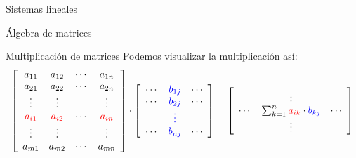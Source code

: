 \begin{chapter}{Sistemas lineales}
\begin{section}{\'Algebra de matrices}
\begin{subsection}{Multiplicaci\'on de matrices}
                Podemos visualizar la multiplicación así:
                \begin{align*}
                    \left[
                    \begin{array}{cccc}
                        a_{11} & a_{12} & \cdots & a_{1n}\\ 
                        a_{21} & a_{22} & \cdots & a_{2n}\\
                        \vdots & \vdots & & \vdots\\
                        \textcolor{red}{a_{i1}} & \textcolor{red}{a_{i2}} & \cdots & \textcolor{red}{a_{in}}\\  
                        \vdots & \vdots & & \vdots\\
                        a_{m1} & a_{m2} & \cdots & a_{mn}
                    \end{array}
                    \right] 
                    \cdot
                    \left[
                    \begin{array}{ccc}
                        \cdots & \textcolor{blue}{b_{1j}} & \cdots\\ 
                        \cdots & \textcolor{blue}{b_{2j}} & \cdots\\
                        & \textcolor{blue}{\vdots} & \\
                        \cdots & \textcolor{blue}{b_{nj}} & \cdots 
                    \end{array}
                    \right]
                    =
                    \left[
                    \begin{array}{ccc}
                        &\vdots&\\
                        \cdots&\sum_{k=1}^n\textcolor{red}{a_{ik}}\cdot
                        \textcolor{blue}{b_{kj}}&\cdots\\
                        &\vdots&
                    \end{array}
                    \right]
                \end{align*} 


\end{subsection}
\end{section}
\end{chapter}
